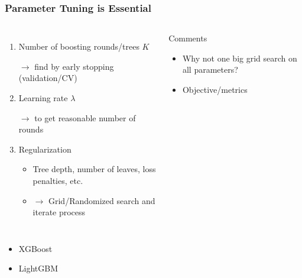 \begin{frame}
	\frametitle{Parameter Tuning is Essential}
	\begin{columns}[onlytextwidth]
		\begin{enumerate}
			\item Number of boosting rounds/trees  $K$
			
			$\rightarrow$ find by early stopping (validation/CV)
			\item Learning rate $\lambda$
			
			$\rightarrow$ to get reasonable number of rounds
			\item Regularization
			\begin{itemize}
				\item Tree depth, number of leaves, loss penalties, etc.
				\item $\rightarrow$ Grid/Randomized search and iterate process
			\end{itemize}
		\end{enumerate}
		\begin{block}{Comments}
			\begin{itemize}
				\item Why not one big grid search on all parameters?
				\item Objective/metrics
			\end{itemize}
		\end{block}
	\end{columns}
	
	\vfill
	
	\begin{example}
		\begin{itemize}
			\item XGBoost
			\item LightGBM
		\end{itemize}
	\end{example}
\end{frame}

